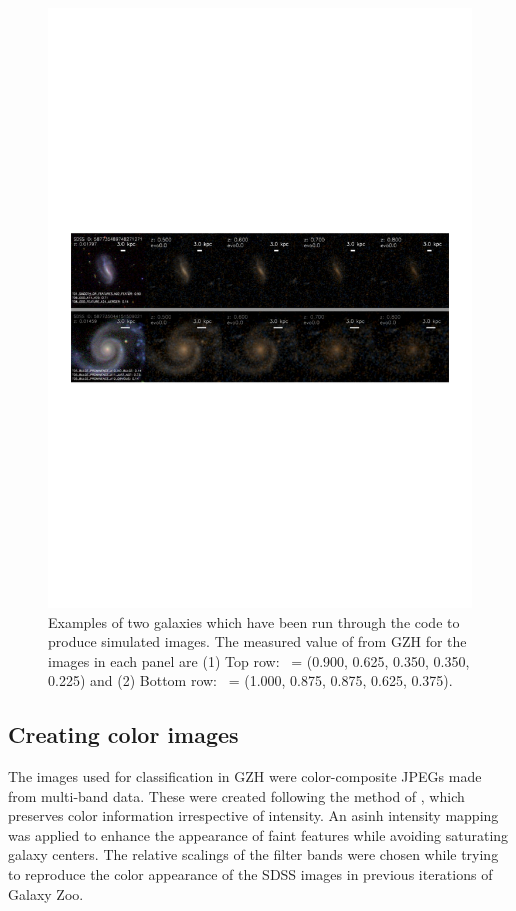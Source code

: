 \documentclass[twocolumn]{aastex6}
\begin{document}
\begin{figure}
\center
\includegraphics[width=160mm]{figures/example_ferengi.pdf}
\caption{Examples of two galaxies which have been run through the \ferengi{}
code to produce simulated \hst{} images. The measured value of \ffeatures{}
from GZH for the images in each panel are (1) Top row: \ffeatures~= (0.900,
0.625, 0.350, 0.350, 0.225) and (2) Bottom row: \ffeatures~= (1.000, 0.875,
0.875, 0.625, 0.375). \label{fig:exampleFERENGI}}
\end{figure}

\subsection{Creating color images}\label{ssec:images}

The images used for classification in GZH were color-composite JPEGs made from
multi-band data. These were created following the method of \citet{lup04}, which
preserves color information irrespective of intensity.  An asinh intensity
mapping was applied to enhance the appearance of faint features while avoiding
saturating galaxy centers. The relative scalings of the filter bands were
chosen while trying to reproduce the color appearance of the SDSS images in
previous iterations of Galaxy Zoo.
\end{document}
